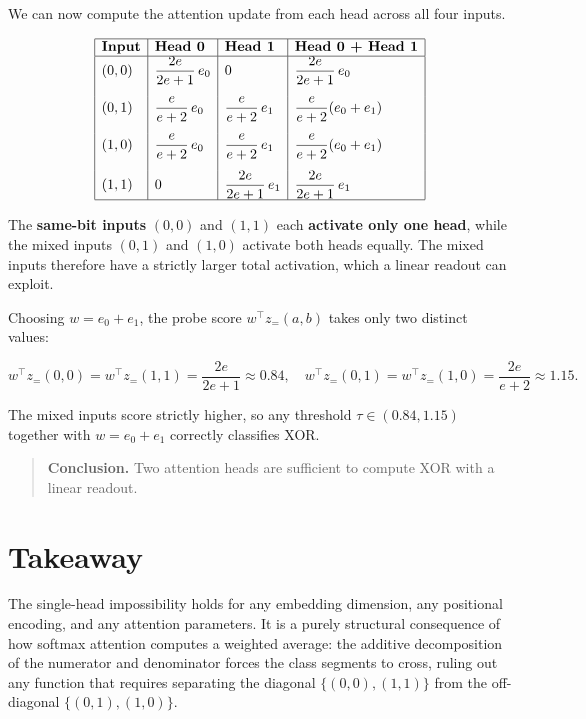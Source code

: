 \documentclass[
  11pt,
]{article}
\begin{document}
We can now compute the attention update from each head across all four
inputs.

\[
\begin{array}{|l|l|l|l|} \hline \textbf{Input} & \textbf{Head 0} & \textbf{Head 1} & \textbf{Head 0 + Head 1}\\ \hline (0,0) & \dfrac{2e}{2e+1}\, e_0 & 0 & \dfrac{2e}{2e+1}\, e_0 \\[12pt] (0,1) & \dfrac{e}{e+2}\, e_0 & \dfrac{e}{e+2}\, e_1 & \dfrac{e}{e+2}(e_0+e_1) \\[12pt] (1,0) & \dfrac{e}{e+2}\, e_0 & \dfrac{e}{e+2}\, e_1 & \dfrac{e}{e+2}(e_0+e_1) \\[12pt] (1,1) & 0 & \dfrac{2e}{2e+1}\, e_1 & \dfrac{2e}{2e+1}\, e_1 \\ \hline \end{array}
\]

The \textbf{same-bit inputs} \((0,0)\) and \((1,1)\) each
\textbf{activate only one head}, while the mixed inputs \((0,1)\) and
\((1,0)\) activate both heads equally. The mixed inputs therefore have a
strictly larger total activation, which a linear readout can exploit.

Choosing \(w = e_0 + e_1\), the probe score \(w^\top z_=(a,b)\) takes
only two distinct values:

\[
w^\top z_=(0,0) = w^\top z_=(1,1) = \frac{2e}{2e+1} \approx 0.84, \quad w^\top z_=(0,1) = w^\top z_=(1,0) = \frac{2e}{e+2} \approx 1.15.
\]

The mixed inputs score strictly higher, so any threshold
\(\tau \in (0.84, 1.15)\) together with \(w = e_0 + e_1\) correctly
classifies XOR.

\begin{quote}
\textbf{Conclusion.} Two attention heads are sufficient to compute XOR
with a linear readout.
\end{quote}

\section{Takeaway}\label{takeaway}

The single-head impossibility holds for any embedding dimension, any
positional encoding, and any attention parameters. It is a purely
structural consequence of how softmax attention computes a weighted
average: the additive decomposition of the numerator and denominator
forces the class segments to cross, ruling out any function that
requires separating the diagonal \(\{(0,0),(1,1)\}\) from the
off-diagonal \(\{(0,1),(1,0)\}\).
\end{document}
